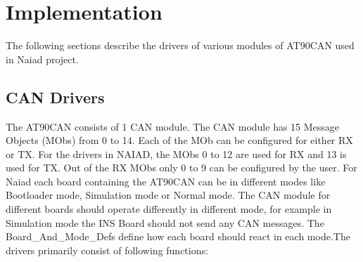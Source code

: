 \section{Implementation}\label{sec:implementation}
The following sections describe the drivers of various modules of AT90CAN used in Naiad project.
\subsection{CAN Drivers}
The AT90CAN consists of 1 CAN module. The CAN module has 15 Message Objects (MObs) from 0 to 14. Each of the MOb can be configured for either RX or TX. For the drivers in NAIAD, the MObs 0 to 12 are used for RX and 13 is used for TX. Out of the RX MObs only 0 to 9 can be configured by the user. For Naiad each board containing the AT90CAN can be in different modes like Bootloader mode, Simulation mode or Normal mode. The CAN module for different boards should operate differently in different mode, for example in Simulation mode the INS Board should not send any CAN messages. The Board\_And\_Mode\_Defs define how each board should react in each mode.The drivers primarily consist of following functions:
